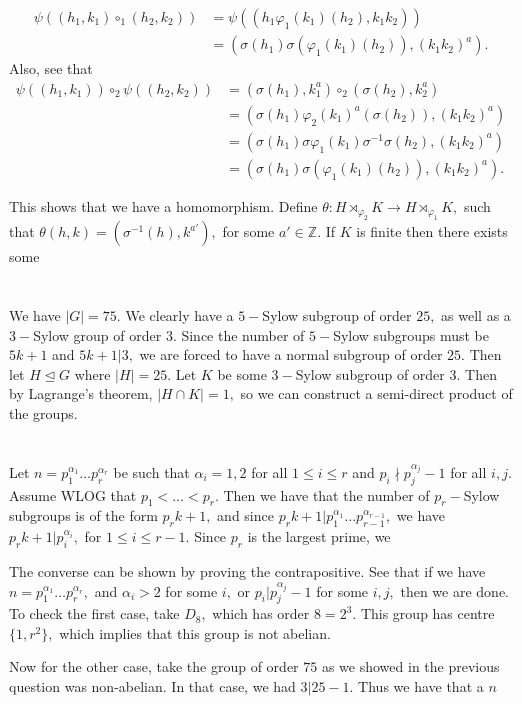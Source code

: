 \documentclass{article}
\begin{document}
\begin{align*}
	\psi((h_1,k_1)\circ_{1}(h_2,k_2)) &= \psi((h_1 \varphi_1(k_1)(h_2),k_1k_2))\\
	&= (\sigma(h_1)\sigma(\varphi_1(k_1)(h_2)), (k_1k_2)^a).
\end{align*}
Also, see that \begin{align*}
	\psi((h_1,k_1))\circ_{2}\psi((h_2,k_2)) &= (\sigma(h_1),k_1^a) \circ_{2} (\sigma(h_2),k_2^a)\\
	&=(\sigma(h_1) \varphi_2(k_1)^a(\sigma(h_2)), (k_1k_2)^a)\\
	&=(\sigma(h_1)\sigma\varphi_1(k_1)\sigma^{-1}\sigma(h_2), (k_1k_2)^a)\\
	&= (\sigma(h_1)\sigma(\varphi_1(k_1)(h_2)), (k_1k_2)^a). 
\end{align*}

This shows that we have a homomorphism. Define $\theta:H \rtimes_{\varphi_2} K \to H \rtimes_{\varphi_1} K,$ such that 
$\theta(h,k)=(\sigma^{-1}(h),k^{a'}),$ for some $a' \in \mathbb{Z}.$ If $K$ is finite then there exists some $ $
\section{} %
We have $|G| =75.$ We clearly have a $5-$Sylow subgroup of order $25,$ as well as a $3-$Sylow group of order $3.$ Since the number of $5-$Sylow subgroups 
must be $5k+1$ and $5k+1|3,$ we are forced to have a normal subgroup of order $25.$ Then let $H \trianglelefteq G$ where $|H|=25.$ Let $K$ be some $3-$Sylow 
subgroup of order $3.$ Then by Lagrange's theorem, $|H \cap K|=1,$ so we can construct a semi-direct product of the groups.  
\section{} %
Let $n= p_1^{\alpha_1}\dots p_r^{\alpha_r}$ be such that $\alpha_i=1,2$ for all $1 \leq i \leq r$ and $p_i \nmid p_j^{\alpha_j}-1$ for all $i,j.$ 
Assume WLOG that $p_1 < \dots < p_r.$ Then we have that the number of $p_r-$Sylow subgroups is of the form $p_rk+1,$ and since $p_rk+1 | p_1^{\alpha_1}\dots 
p_{r-1}^{\alpha_{r-1}},$ we have $p_rk+1|p_i^{\alpha_i},$ for $1 \leq i \leq r-1.$ Since $p_r$ is the largest prime, we 

The converse can be shown by proving the contrapositive. See that if we have $n=p_1^{\alpha_1}\dots p_r^{\alpha_r},$ and $\alpha_i>2$ for some $i,$ or $p_i 
| p_j^{\alpha_j}-1$ for some $i,j,$ then we are done. To check the first case, take $D_8,$ which has order $8=2^3.$ This group has centre $\{1,r^2\},$ which 
implies that this group is not abelian.

Now for the other case, take the group of order $75$ as we showed in the previous question was non-abelian. In that case, we had $3|25-1.$ Thus we have that 
a  $n$
\end{document}
